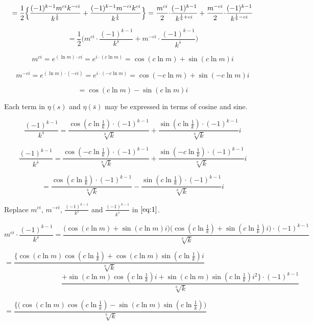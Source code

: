 \documentclass{amsart}
\begin{document}
	\[ = \frac{1}{2} \Bigl\{ \frac{ (-1)^{k-1}m^{ci}k^{-ci}  }{k^{\frac{1}{b}}} + \frac{ (-1)^{k-1}m^{-ci}k^{ci}  }{k^{\frac{1}{b}}}  \Bigr\} = \frac{m^{ci}}{2} {\cdot} \frac{(-1)^{k-1}}{k^{\frac{1}{b}+ci}} + \frac{m^{-ci}}{2} {\cdot} \frac{(-1)^{k-1}}{k^{\frac{1}{b}-ci}} \]
	
	\begin{equation} = \frac{1}{2} \Big( m^{ci} {\cdot} \frac{(-1)^{k-1}}{k^{s}} + m^{-ci} {\cdot} \frac{(-1)^{k-1}}{k^{\bar{s}}} \label{eq:1}  \Big) \end{equation}
	
	\[\]
	\[ m^{ci} =  e^{(\ln m){\cdot}ci} = e^{i{\cdot}(c\ln m)} = \cos(c \ln m) + \sin(c \ln m) i \]
	
	\[ m^{-ci} =  e^{(\ln m){\cdot}(-ci)} = e^{i{\cdot}(-c\ln m)} = \cos(-c \ln m) + \sin(-c \ln m) i \]
	
	\[ = \cos(c \ln m) - \sin(c \ln m) i  \]
	\[\]
	
	Each term in $\eta(s)$ and $\eta(\bar{s})$ may be expressed in terms of cosine and sine.
	
	\[ \frac{(-1)^{k-1}}{k^s} = \frac{\cos(c \ln \frac{1}{k}){\cdot}(-1)^{k-1}}{\sqrt[b]{k}} + \frac{\sin(c \ln \frac{1}{k}){\cdot}(-1)^{k-1}}{\sqrt[b]{k}} i \]
	
	\[ \frac{(-1)^{k-1}}{k^{\bar{s}}} = \frac{\cos(-c \ln \frac{1}{k}){\cdot}(-1)^{k-1}}{\sqrt[b]{k}} + \frac{\sin(-c \ln \frac{1}{k}){\cdot}(-1)^{k-1}}{\sqrt[b]{k}} i \]
	
	\[ = \frac{\cos(c \ln \frac{1}{k}){\cdot}(-1)^{k-1}}{\sqrt[b]{k}} - \frac{\sin(c \ln \frac{1}{k}){\cdot}(-1)^{k-1}}{\sqrt[b]{k}} i \]
	\[\]
	
	Replace $m^{ci}$, $m^{-ci}$, $\frac{(-1)^{k-1}}{k^s}$ and $\frac{(-1)^{k-1}}{k^{\bar{s}}}$ in $\eqref{eq:1}$.
	
	\[ m^{ci} {\cdot} \frac{(-1)^{k-1}}{k^s} = \frac{\Big( \cos(c \ln m) {+} \sin(c \ln m) i \Big) \Big(\cos(c \ln \frac{1}{k}) {+} \sin(c \ln \frac{1}{k})i \Big) {\cdot} (-1)^{k-1} }{\sqrt[b]{k}} \]
	
	\[  = \frac{ \Big\{ \cos(c \ln m)\cos(c \ln \frac{1}{k}) {+} \cos(c \ln m)\sin(c \ln \frac{1}{k})i }{\sqrt[b]{k}} \qquad\qquad\qquad\qquad\qquad\qquad\qquad  \]
	\[ \qquad\qquad\qquad\qquad \frac{ {+} \sin(c \ln m)\cos(c \ln \frac{1}{k})i {+} \sin(c \ln m)\sin(c \ln \frac{1}{k})i^2 \Big\} {\cdot} (-1)^{k-1} }{\sqrt[b]{k}}   \]
	
	
	\[ = \frac{ \Big\{ \Big( \cos(c \ln m)\cos(c \ln \frac{1}{k}) - \sin(c \ln m)\sin(c \ln \frac{1}{k}) \Big) }{\sqrt[b]{k}} \qquad\qquad\qquad\qquad\qquad\qquad\qquad  \]
	
\end{document}
